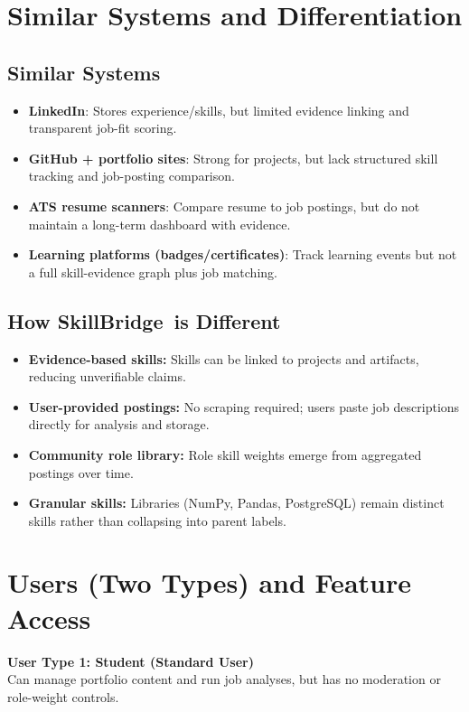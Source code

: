 \documentclass[11pt]{article}
\newcommand{\ProjectName}{SkillBridge} %
\begin{document}
\section{Similar Systems and Differentiation} %
\subsection{Similar Systems}
\begin{itemize}[leftmargin=*]
  \item \textbf{LinkedIn}: Stores experience/skills, but limited evidence linking and transparent job-fit scoring.
  \item \textbf{GitHub + portfolio sites}: Strong for projects, but lack structured skill tracking and job-posting comparison.
  \item \textbf{ATS resume scanners}: Compare resume to job postings, but do not maintain a long-term dashboard with evidence.
  \item \textbf{Learning platforms (badges/certificates)}: Track learning events but not a full skill-evidence graph plus job matching.
\end{itemize}

\subsection{How \ProjectName\ is Different}
\begin{itemize}[leftmargin=*]
  \item \textbf{Evidence-based skills:} Skills can be linked to projects and artifacts, reducing unverifiable claims.
  \item \textbf{User-provided postings:} No scraping required; users paste job descriptions directly for analysis and storage.
  \item \textbf{Community role library:} Role skill weights emerge from aggregated postings over time.
  \item \textbf{Granular skills:} Libraries (NumPy, Pandas, PostgreSQL) remain distinct skills rather than collapsing into parent labels.
\end{itemize}

\section{Users (Two Types) and Feature Access} %
\textbf{User Type 1: Student (Standard User)} \\
Can manage portfolio content and run job analyses, but has no moderation or role-weight controls.
\end{document}
